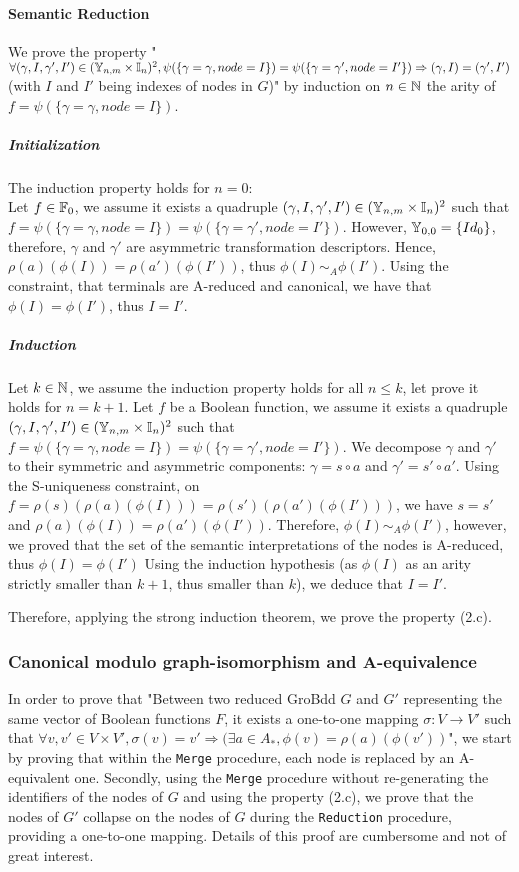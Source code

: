 \documentclass[a4paper,10pt]{article}
\begin{document}
\paragraph{Semantic Reduction}
We prove the property "$\forall (\gamma, I, \gamma', I') \in (\mathbb{Y}_{n, m} \times \mathbb{I}_n)^2, \psi(\{\gamma = \gamma, node = I\}) = \psi(\{\gamma = \gamma', node = I'\}) \Rightarrow (\gamma, I) = (\gamma', I')$ (with $I$ and $I'$ being indexes of nodes in $G$)" by induction on $n\in\mathbb{N}$ the arity of $f = \psi(\{\gamma = \gamma, node = I\})$.

\subparagraph{Initialization}
The induction property holds for $n = 0$:\\
Let $f\in\mathbb{F}_0$, we assume it exists a quadruple $(\gamma, I, \gamma', I') \in (\mathbb{Y}_{n, m} \times \mathbb{I}_n)^2$ such that $f = \psi(\{\gamma = \gamma, node = I\}) = \psi(\{\gamma = \gamma', node = I'\})$.
However, $\mathbb{Y}_{0, 0} = \{Id_0\}$, therefore, $\gamma$ and $\gamma'$ are asymmetric transformation descriptors.
Hence, $\rho(a)(\phi(I)) = \rho(a')(\phi(I'))$, thus $\phi(I) \sim_A \phi(I')$.
Using the constraint, that terminals are A-reduced and canonical, we have that $\phi(I) = \phi(I')$, thus $I = I'$.

\subparagraph{Induction}
Let $k\in\mathbb{N}$, we assume the induction property holds for all $n\leq k$, let prove it holds for $n = k+1$.
Let $f$ be a Boolean function, we assume it exists a quadruple $(\gamma, I, \gamma', I') \in (\mathbb{Y}_{n, m} \times \mathbb{I}_n)^2$ such that $f = \psi(\{\gamma = \gamma, node = I\}) = \psi(\{\gamma = \gamma', node = I'\})$.
We decompose $\gamma$ and $\gamma'$ to their symmetric and asymmetric components: $\gamma = s \circ a$ and $\gamma' = s' \circ a'$.
Using the S-uniqueness constraint, on $f = \rho(s)(\rho(a)(\phi(I))) = \rho(s')(\rho(a')(\phi(I')))$, we have $s = s'$ and $\rho(a)(\phi(I)) = \rho(a')(\phi(I'))$.
Therefore, $\phi(I) \sim_A \phi(I')$, however, we proved that the set of the semantic interpretations of the nodes is A-reduced, thus $\phi(I) = \phi(I')$
Using the induction hypothesis (as $\phi(I)$ as an arity strictly smaller than $k+1$, thus smaller than $k$), we deduce that $I = I'$.

Therefore, applying the strong induction theorem, we prove the property (2.c).

\subsubsection{Canonical modulo graph-isomorphism and A-equivalence}
In order to prove that "Between two reduced GroBdd $G$ and $G'$ representing the same vector of Boolean functions $F$, it exists a one-to-one mapping $\sigma : V \longrightarrow V'$ such that $\forall v, v' \in V \times V', \sigma(v) = v' \Rightarrow (\exists a \in A_{*}, \phi(v) = \rho(a)(\phi(v'))$", we start by proving that within the \texttt{Merge} procedure, each node is replaced by an A-equivalent one.
Secondly, using the \texttt{Merge} procedure without re-generating the identifiers of the nodes of $G$ and using the property (2.c), we prove that the nodes of $G'$ collapse on the nodes of $G$ during the \texttt{Reduction} procedure, providing a one-to-one mapping.
Details of this proof are cumbersome and not of great interest.
\end{document}
